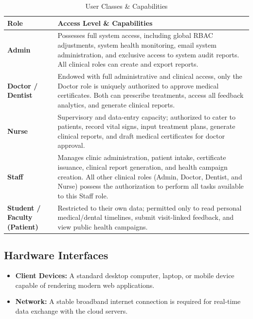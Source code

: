 \begin{table}[htbp]
\centering
\caption{User Classes \& Capabilities}
\begin{tabular}{|p{}|p{}|}
\hline
\textbf{Role} & \textbf{Access Level \& Capabilities} \\
\hline
\textbf{Admin} & Possesses full system access, including global RBAC adjustments, system health monitoring, email system administration, and exclusive access to system audit reports. All clinical roles can create and export reports. \\
\hline
\textbf{Doctor / Dentist} & Endowed with full administrative and clinical access, only the Doctor role is uniquely authorized to approve medical certificates. Both can prescribe treatments, access all feedback analytics, and generate clinical reports. \\
\hline
\textbf{Nurse} & Supervisory and data-entry capacity; authorized to cater to patients, record vital signs, input treatment plans, generate clinical reports, and draft medical certificates for doctor approval. \\
\hline
\textbf{Staff} & Manages clinic administration, patient intake, certificate issuance, clinical report generation, and health campaign creation. All other clinical roles (Admin, Doctor, Dentist, and Nurse) possess the authorization to perform all tasks available to this Staff role. \\
\hline
\textbf{Student / Faculty (Patient)} & Restricted to their own data; permitted only to read personal medical/dental timelines, submit visit-linked feedback, and view public health campaigns. \\
\hline
\end{tabular}
\end{table}

\subsection{Hardware Interfaces}
\begin{itemize}
    \item \textbf{Client Devices:} A standard desktop computer, laptop, or mobile device capable of rendering modern web applications.
    \item \textbf{Network:} A stable broadband internet connection is required for real-time data exchange with the cloud servers.
\end{itemize}


